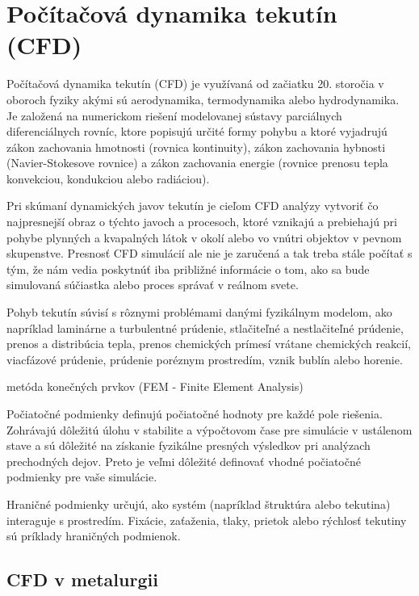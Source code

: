 \documentclass[]{tukediphc}
\begin{document}
\section{Počítačová dynamika tekutín (CFD)}

Počítačová dynamika tekutín (CFD) je využívaná od začiatku 20. storočia v oboroch fyziky akými sú aerodynamika, termodynamika alebo hydrodynamika. Je založená na numerickom riešení modelovanej sústavy parciálnych diferenciálnych rovníc, ktore popisujú určité formy pohybu a ktoré vyjadrujú zákon zachovania hmotnosti (rovnica kontinuity), zákon zachovania hybnosti (Navier-Stokesove rovnice) a zákon zachovania energie (rovnice prenosu tepla konvekciou, kondukciou alebo radiáciou).

Pri skúmaní dynamických javov tekutín je cieľom CFD analýzy vytvoriť čo najpresnejší obraz o týchto javoch a procesoch, ktoré vznikajú a prebiehajú pri pohybe plynných a kvapalných látok v okolí alebo vo vnútri objektov v pevnom skupenstve. Presnosť CFD simulácií ale nie je zaručená a tak treba stále počítať s tým, že nám vedia poskytnúť iba približné informácie o tom, ako sa bude simulovaná súčiastka alebo proces správať v reálnom svete. 

Pohyb tekutín súvisí s rôznymi problémami danými fyzikálnym modelom, ako napríklad laminárne a turbulentné prúdenie, stlačiteľné a nestlačiteľné prúdenie, prenos a distribúcia tepla, prenos chemických prímesí vrátane chemických reakcií, viacfázové prúdenie, prúdenie poréznym prostredím, vznik bublín alebo horenie.


metóda konečných prvkov (FEM - Finite Element Analysis)


Počiatočné podmienky definujú počiatočné hodnoty pre každé pole riešenia. Zohrávajú dôležitú úlohu v stabilite a výpočtovom čase pre simulácie v ustálenom stave a sú dôležité na získanie fyzikálne presných výsledkov pri analýzach prechodných dejov. Preto je veľmi dôležité definovať vhodné počiatočné podmienky pre vaše simulácie.

Hraničné podmienky určujú, ako systém (napríklad štruktúra alebo tekutina) interaguje s prostredím. Fixácie, zaťaženia, tlaky, prietok alebo rýchlosť tekutiny sú príklady hraničných podmienok.


\subsection{CFD v metalurgii}
\end{document}
